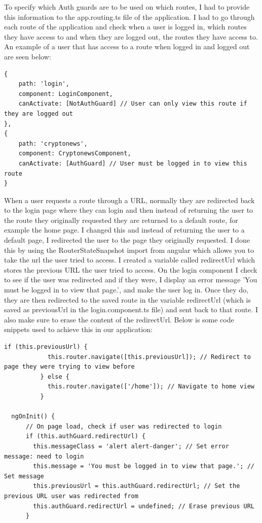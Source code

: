 To specify which Auth guards are to be used on which routes, I had to provide this information to the app.routing.ts file of the application. I had to go through each route of the application and check when a user is logged in, which routes they have access to and when they are logged out, the routes they have access to. An example of a user that has access to a route when logged in and logged out are seen below:

\begin{lstlisting}
{
    path: 'login',
    component: LoginComponent,
    canActivate: [NotAuthGuard] // User can only view this route if they are logged out
},
{
    path: 'cryptonews',
    component: CryptonewsComponent,
    canActivate: [AuthGuard] // User must be logged in to view this route
}
\end{lstlisting}

When a user requests a route through a URL, normally they are redirected back to the login page where they can login and then instead of returning the user to the route they originally requested they are returned to a default route, for example the home page. I changed this and instead of returning the user to a default page, I redirected the user to the page they originally requested. I done this by using the RouterStateSnapshot import from angular which allows you to take the url the user tried to access. I created a variable called redirectUrl which stores the previous URL the user tried to access. On the login component I check to see if the user was redirected and if they were, I display an error message 'You must be logged in to view that page.', and make the user log in. Once they do, they are then redirected to the saved route in the variable redirectUrl (which is saved as previousUrl in the login.component.ts file) and sent back to that route. I also make sure to erase the content of the redirectUrl. Below is some code snippets used to achieve this in our application:

\begin{lstlisting}
if (this.previousUrl) {
            this.router.navigate([this.previousUrl]); // Redirect to page they were trying to view before
          } else {
            this.router.navigate(['/home']); // Navigate to home view
          }

  ngOnInit() {
      // On page load, check if user was redirected to login
      if (this.authGuard.redirectUrl) {
        this.messageClass = 'alert alert-danger'; // Set error message: need to login
        this.message = 'You must be logged in to view that page.'; // Set message
        this.previousUrl = this.authGuard.redirectUrl; // Set the previous URL user was redirected from
        this.authGuard.redirectUrl = undefined; // Erase previous URL
      }
\end{lstlisting}


